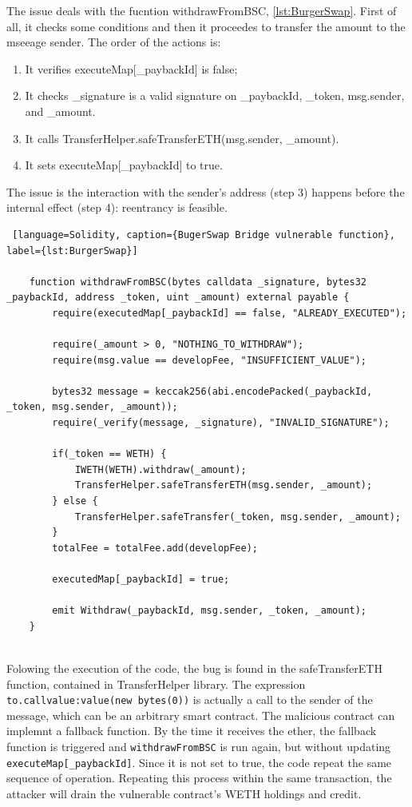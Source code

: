 The issue deals with the fucntion withdrawFromBSC, \autoref{lst:BurgerSwap}. 
First of all, it checks some conditions and then it proceedes to transfer the amount to the mseeage sender. 
The order of the actions is:
\begin{enumerate}
    \item It verifies executeMap[\_paybackId] is false;
    \item It checks \_signature is a valid signature on \_paybackId, \_token, msg.sender, and \_amount.
    \item It calls TransferHelper.safeTransferETH(msg.sender, \_amount).
    \item It sets executeMap[\_paybackId] to true.
\end{enumerate}

The issue is the interaction with the sender's address (step 3) happens before the internal effect (step 4): reentrancy is feasible.

\begin{lstlisting} [language=Solidity, caption={BugerSwap Bridge vulnerable function}, label={lst:BurgerSwap}]

    function withdrawFromBSC(bytes calldata _signature, bytes32 _paybackId, address _token, uint _amount) external payable {
        require(executedMap[_paybackId] == false, "ALREADY_EXECUTED");
        
        require(_amount > 0, "NOTHING_TO_WITHDRAW");
        require(msg.value == developFee, "INSUFFICIENT_VALUE");
        
        bytes32 message = keccak256(abi.encodePacked(_paybackId, _token, msg.sender, _amount));
        require(_verify(message, _signature), "INVALID_SIGNATURE");
        
        if(_token == WETH) {
            IWETH(WETH).withdraw(_amount);
            TransferHelper.safeTransferETH(msg.sender, _amount);
        } else {
            TransferHelper.safeTransfer(_token, msg.sender, _amount);
        }
        totalFee = totalFee.add(developFee);
        
        executedMap[_paybackId] = true;
        
        emit Withdraw(_paybackId, msg.sender, _token, _amount);
    }
    
\end{lstlisting}

Folowing the execution of the code, the bug is found in the safeTransferETH function, contained in TransferHelper library. 
The expression \texttt{to.call{value:value}(new bytes(0))} is actually a call to the sender of the message, which can be an arbitrary smart contract. 
The malicious contract can implemnt a fallback function. By the time it receives the ether, the fallback function is 
triggered and \texttt{withdrawFromBSC} is run again, but without updating \texttt{executeMap[\_paybackId]}. 
Since it is not set to true, the code repeat the same sequence of operation. 
Repeating this process within the same transaction, the attacker will drain the vulnerable contract's WETH holdings and credit.

